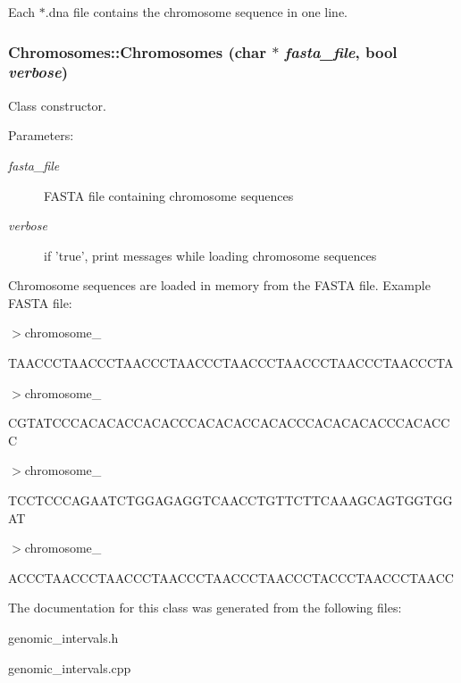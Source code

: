 Each $\ast$.dna file contains the chromosome sequence in one line. \hypertarget{classChromosomes_bb3466c6c94f42f22a872b043c415b67}{
\subsubsection[Chromosomes]{\setlength{\rightskip}{0pt plus 5cm}Chromosomes::Chromosomes (char $\ast$ {\em fasta\_\-file}, \/  bool {\em verbose})}}
\label{classChromosomes_bb3466c6c94f42f22a872b043c415b67}


Class constructor. 

\begin{Desc}
\item[Parameters:]
\begin{description}
\item[{\em fasta\_\-file}]FASTA file containing chromosome sequences \item[{\em verbose}]if 'true', print messages while loading chromosome sequences\end{description}
\end{Desc}
Chromosome sequences are loaded in memory from the FASTA file. Example FASTA file:

$>$chromosome\_ \par
 TAACCCTAACCCTAACCCTAACCCTAACCCTAACCCTAACCCTAACCCTA \par
 $>$chromosome\_ \par
 CGTATCCCACACACCACACCCACACACCACACCCACACACACCCACACCC \par
 $>$chromosome\_ \par
 TCCTCCCAGAATCTGGAGAGGTCAACCTGTTCTTCAAAGCAGTGGTGGAT \par
 $>$chromosome\_ \par
 ACCCTAACCCTAACCCTAACCCTAACCCTAACCCTACCCTAACCCTAACC \par
 

The documentation for this class was generated from the following files:\begin{CompactItemize}
\item 
genomic\_\-intervals.h\item 
genomic\_\-intervals.cpp\end{CompactItemize}
